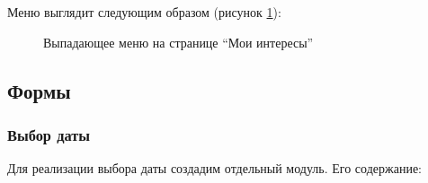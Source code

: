 \documentclass[a4paper,14pt]{extarticle}
\begin{document}
Меню выглядит следующим образом (рисунок \ref{fig:interests}):

\begin{figure}[H]
    \centering
    \hspace{.15\linewidth}
    \caption{Выпадающее меню на странице \enquote{Мои интересы}}
    \label{fig:interests}
\end{figure}

\subsection{Формы}
\subsubsection{Выбор даты}

Для реализации выбора даты создадим отдельный модуль. Его содержание:
\end{document}
